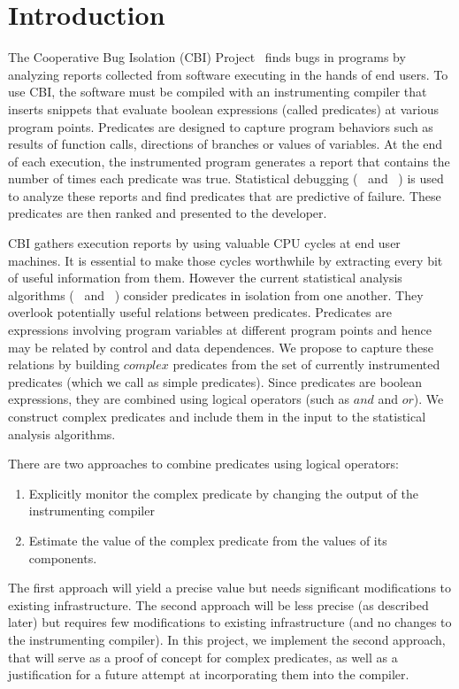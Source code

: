 \section{Introduction}

The Cooperative Bug Isolation (CBI) Project~\cite{Liblit:2004:CBI} finds bugs in programs by analyzing reports collected from software executing in the hands of end users.  To use CBI, the software must be compiled with an instrumenting compiler that inserts snippets that evaluate boolean expressions (called predicates) at various program points.  Predicates are designed to capture program behaviors such as results of function calls, directions of branches or values of variables.  At the end of each execution, the instrumented program generates a report that contains the number of times each predicate was true.  Statistical debugging (~\cite{Liblit:2005:SSBI} and ~\cite{Zheng:2006:SDSIMB}) is used to analyze these reports and find predicates that are predictive of failure.  These predicates are then ranked and presented to the developer.

CBI gathers execution reports by using valuable CPU cycles at end user machines.  It is essential to make those cycles worthwhile by extracting every bit of useful information from them.  However the current statistical analysis algorithms (~\cite{Liblit:2005:SSBI} and ~\cite{Zheng:2006:SDSIMB}) consider predicates in isolation from one another.  They overlook potentially useful relations between predicates.  Predicates are expressions involving program variables at different program points and hence may be related by control and data dependences.  We propose to capture these relations by building $complex$ predicates from the set of currently instrumented predicates (which we call as simple predicates).  Since predicates are boolean expressions, they are combined using logical operators (such as $and$ and $or$).  We construct complex predicates and include them in the input to the statistical analysis algorithms.

There are two approaches to combine predicates using logical operators:
\begin{enumerate}
\item Explicitly monitor the complex predicate by changing the output of the instrumenting compiler
\item Estimate the value of the complex predicate from the values of its components.
\end{enumerate}

The first approach will yield a precise value but needs significant modifications to existing infrastructure.  The second approach will be less precise (as described later) but requires few modifications to existing infrastructure (and no changes to the instrumenting compiler).  In this project, we implement the second approach, that will serve as a proof of concept for complex predicates, as well as a justification for a future attempt at incorporating them into the compiler.

